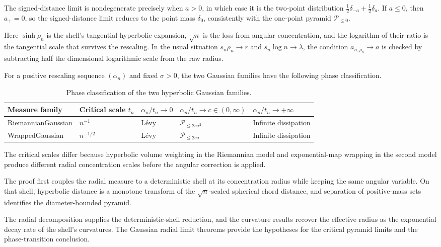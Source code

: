 \documentclass{amsart}
\numberwithin{equation}{section}
\theoremstyle{plain}
\theoremstyle{definition}
\theoremstyle{remark}
\begin{document}
The signed-distance limit is nondegenerate precisely when $a>0$, in which case it is the two-point distribution $\frac12\delta_{-a}+\frac12\delta_a$.  If $a\le0$, then $a_+=0$, so the signed-distance limit reduces to the point mass $\delta_0$, consistently with the one-point pyramid $\mathcal P_{\le0}$.

Here $\sinh\rho_n$ is the shell's tangential hyperbolic expansion, $\sqrt n$ is the loss from angular concentration, and the logarithm of their ratio is the tangential scale that survives the rescaling.  In the usual situation $s_n\rho_n\to r$ and $s_n\log n\to\lambda$, the condition $a_{n,\rho_n}\to a$ is checked by subtracting half the dimensional logarithmic scale from the raw radius.

For a positive rescaling sequence $(\alpha_n)$ and fixed $\sigma>0$, the two Gaussian families have the following phase classification.
\begin{table}[H]
	\centering
	\small
	\setlength{\tabcolsep}{3pt}
	\begin{tabular}{@{}p{}p{}p{}p{}p{}@{}}
		\hline
		Measure family & Critical scale $t_n$ & $\alpha_n/t_n\to0$ & $\alpha_n/t_n\to c\in(0,\infty)$ & $\alpha_n/t_n\to+\infty$ \\
		\hline
		Riemannian\newline Gaussian & $n^{-1}$ & L\'evy & $\mathcal P_{\le2c\sigma^2}$ & Infinite dissipation \\
		Wrapped\newline Gaussian & $n^{-1/2}$ & L\'evy & $\mathcal P_{\le2c\sigma}$ & Infinite dissipation \\
		\hline
	\end{tabular}
	\caption{Phase classification of the two hyperbolic Gaussian families.}
	\label{tab:intro-gaussian-phases}
\end{table}
The critical scales differ because hyperbolic volume weighting in the Riemannian model and exponential-map wrapping in the second model produce different radial concentration scales before the angular correction is applied.

The proof first couples the radial measure to a deterministic shell at its concentration radius while keeping the same angular variable.  On that shell, hyperbolic distance is a monotone transform of the $\sqrt n$-scaled spherical chord distance, and separation of positive-mass sets identifies the diameter-bounded pyramid.

The radial decomposition supplies the deterministic-shell reduction, and the curvature results recover the effective radius as the exponential decay rate of the shell's curvatures.  The Gaussian radial limit theorems provide the hypotheses for the critical pyramid limits and the phase-transition conclusion.
\end{document}
